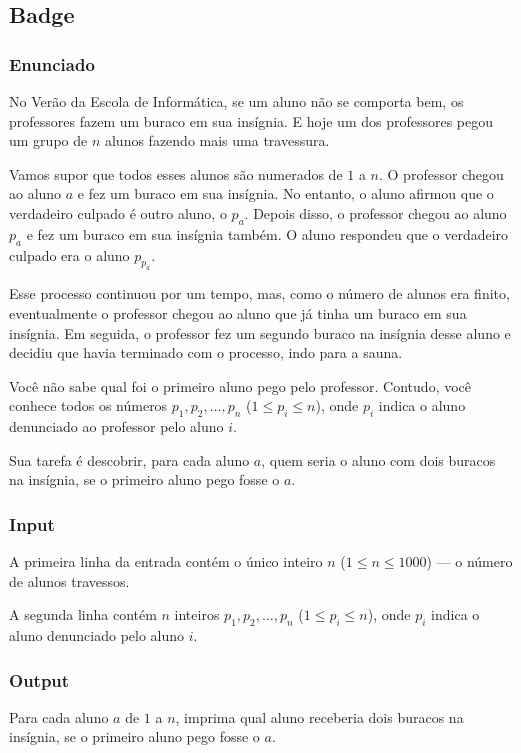 \subsection{Badge}

\subsubsection*{Enunciado}
No Verão da Escola de Informática, se um aluno não se comporta bem, os professores fazem um buraco em sua insígnia. E hoje um dos professores pegou um grupo de \( n \) alunos fazendo mais uma travessura. 

Vamos supor que todos esses alunos são numerados de \( 1 \) a \( n \). O professor chegou ao aluno \( a \) e fez um buraco em sua insígnia. No entanto, o aluno afirmou que o verdadeiro culpado é outro aluno, o \( p_a \). Depois disso, o professor chegou ao aluno \( p_a \) e fez um buraco em sua insígnia também. O aluno respondeu que o verdadeiro culpado era o aluno \( p_{p_a} \). 

Esse processo continuou por um tempo, mas, como o número de alunos era finito, eventualmente o professor chegou ao aluno que já tinha um buraco em sua insígnia. Em seguida, o professor fez um segundo buraco na insígnia desse aluno e decidiu que havia terminado com o processo, indo para a sauna.

Você não sabe qual foi o primeiro aluno pego pelo professor. Contudo, você conhece todos os números \( p_1, p_2, \dots, p_n \) (\( 1 \le p_i \le n \)), onde \( p_i \) indica o aluno denunciado ao professor pelo aluno \( i \).

Sua tarefa é descobrir, para cada aluno \( a \), quem seria o aluno com dois buracos na insígnia, se o primeiro aluno pego fosse o \( a \).

\subsubsection*{Input}
A primeira linha da entrada contém o único inteiro \( n \) (\( 1 \le n \le 1000 \)) --- o número de alunos travessos.

A segunda linha contém \( n \) inteiros \( p_1, p_2, \dots, p_n \) (\( 1 \le p_i \le n \)), onde \( p_i \) indica o aluno denunciado pelo aluno \( i \).

\subsubsection*{Output}
Para cada aluno \( a \) de \( 1 \) a \( n \), imprima qual aluno receberia dois buracos na insígnia, se o primeiro aluno pego fosse o \( a \).

